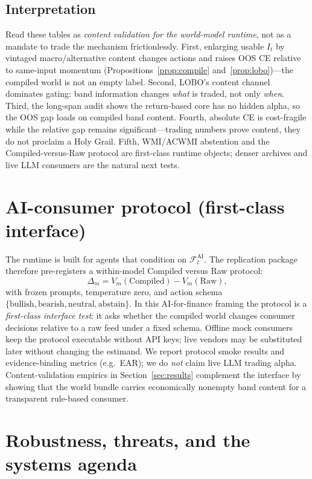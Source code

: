 \documentclass[12pt]{article}
\begin{document}
\subsection{Interpretation}
Read these tables as \emph{content validation for the world-model runtime}, not as a mandate to trade the mechanism frictionlessly. First, enlarging usable $I_t$ by vintaged macro/alternative content changes actions and raises OOS CE relative to same-input momentum (Propositions~\ref{prop:compile} and~\ref{prop:lobo})---the compiled world is not an empty label. Second, LOBO's content channel dominates gating: band information changes \emph{what} is traded, not only \emph{when}. Third, the long-span audit shows the return-based core has no hidden alpha, so the OOS gap loads on compiled band content. Fourth, absolute CE is cost-fragile while the relative gap remains significant---trading numbers prove content, they do not proclaim a Holy Grail. Fifth, WMI/ACWMI abstention and the Compiled-versus-Raw protocol are first-class runtime objects; denser archives and live LLM consumers are the natural next tests.

\section{AI-consumer protocol (first-class interface)}
\label{sec:ai_consumer}

The runtime is built for agents that condition on $\mathcal{F}^{\mathrm{AI}}_t$. The replication package therefore pre-registers a within-model Compiled versus Raw protocol:
\[
\Delta_m=V_m(\mathrm{Compiled})-V_m(\mathrm{Raw}),
\]
with frozen prompts, temperature zero, and action schema $\{\mathrm{bullish},\mathrm{bearish},\mathrm{neutral},\mathrm{abstain}\}$. In this AI-for-finance framing the protocol is a \emph{first-class interface test}: it asks whether the compiled world changes consumer decisions relative to a raw feed under a fixed schema. Offline mock consumers keep the protocol executable without API keys; live vendors may be substituted later without changing the estimand. We report protocol smoke results and evidence-binding metrics (e.g.\ EAR); we do \emph{not} claim live LLM trading alpha. Content-validation empirics in Section~\ref{sec:results} complement the interface by showing that the world bundle carries economically nonempty band content for a transparent rule-based consumer.

\section{Robustness, threats, and the systems agenda}
\label{sec:robust}
\end{document}
